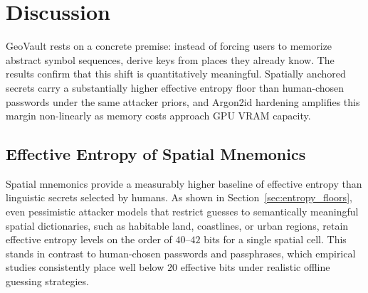 \documentclass[mathematics,article,accept,pdftex,moreauthors]{Definitions/mdpi}
\begin{document}
\section{Discussion\label{sec6}}

{GeoVault rests on a concrete premise: instead of forcing users to memorize abstract symbol sequences, derive keys from places they already know. The results confirm that this shift is quantitatively meaningful. Spatially anchored secrets carry a substantially higher effective entropy floor than human-chosen passwords under the same attacker priors, and Argon2id hardening amplifies this margin non-linearly as memory costs approach GPU VRAM capacity.}

\subsection{Effective Entropy of Spatial Mnemonics}

{Spatial mnemonics provide a measurably higher baseline of effective entropy than linguistic secrets selected by humans.} As shown in Section~\ref{sec:entropy_floors}, even pessimistic attacker models that restrict guesses to semantically meaningful spatial dictionaries, such as habitable land, coastlines, or urban regions, retain effective entropy levels on the order of $40$--$42$ bits for a single spatial cell. This stands in contrast to human-chosen passwords and passphrases, which empirical studies consistently place well below $20$ effective bits under realistic offline guessing strategies.
\end{document}
